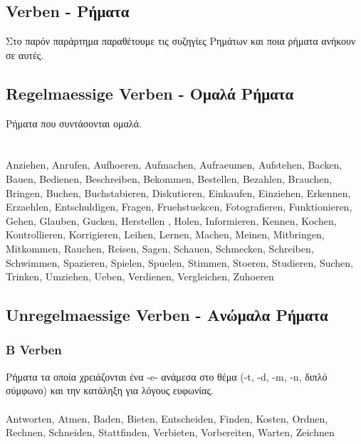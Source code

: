 
\begin{appendix}
 
 \section{Verben - Ρήματα}
 
 Στο παρόν παράρτημα παραθέτουμε τις συζηγίες Ρημάτων και ποια ρήματα ανήκουν σε αυτές.
 
 \subsection{Regelmaessige Verben - Ομαλά Ρήματα}
 Ρήματα που συντάσονται ομαλά. \\ 
  \\ 
  \\
 
 \gls{Anziehen}, \gls{Anrufen}, \gls{Aufhoeren}, \gls{Aufmachen}, \gls{Aufraeumen}, \gls{Aufstehen}, \gls{Backen}, \gls{Bauen}, \gls{Bedienen}, \gls{Beschreiben}, \gls{Bekommen}, \gls{Bestellen}, \gls{Bezahlen}, \gls{Brauchen}, \gls{Bringen}, \gls{Buchen}, \gls{Buchstabieren}, \gls{Diskutieren}, \gls{Einkaufen}, \gls{Einziehen}, \gls{Erkennen}, \gls{Erzaehlen}, \gls{Entschuldigen}, \gls{Fragen}, \gls{Fruehstuekcen}, \gls{Fotografieren}, \gls{Funktionieren}, \gls{Gehen}, \gls{Glauben}, \gls{Gucken}, \gls{Herstellen} , \gls{Holen}, \gls{Informieren}, \gls{Kennen}, \gls{Kochen}, \gls{Kontrollieren}, \gls{Korrigieren}, \gls{Leihen}, \gls{Lernen}, \gls{Machen}, \gls{Meinen}, \gls{Mitbringen}, \gls{Mitkommen}, \gls{Rauchen}, \gls{Reisen}, \gls{Sagen}, \gls{Schauen}, \gls{Schmecken}, \gls{Schreiben}, \gls{Schwimmen}, \gls{Spazieren}, \gls{Spielen}, \gls{Spuelen}, \gls{Stimmen}, \gls{Stoeren}, \gls{Studieren}, \gls{Suchen}, \gls{Trinken}, \gls{Umziehen}, \gls{Ueben}, \gls{Verdienen}, \gls{Vergleichen}, \gls{Zuhoeren}
 
 \subsection{Unregelmaessige Verben - Ανώμαλα Ρήματα}
 
 \subsubsection{B Verben}
 Ρήματα τα οποία χρειάζονται ένα -e- ανάμεσα στο θέμα (-t, -d, -m, -n, διπλό σύμφωνο) και την κατάληξη για λόγους ευφωνίας. \\ \newline
  \\ \newline
 \gls{Antworten}, \gls{Atmen}, \gls{Baden}, \gls{Bieten}, \gls{Entscheiden}, \gls{Finden}, \gls{Kosten}, \gls{Ordnen}, \gls{Rechnen}, \gls{Schneiden}, \gls{Stattfinden}, \gls{Verbieten}, \gls{Vorbereiten}, \gls{Warten}, \gls{Zeichnen}
 

\end{appendix}
